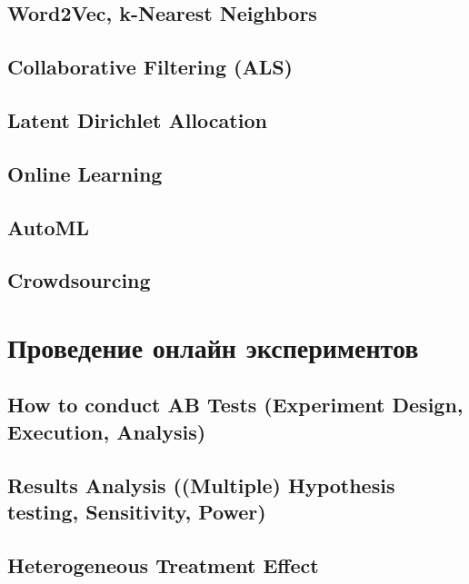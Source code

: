 \documentclass[openany,12pt]{book}
\numberwithin{equation}{section}
\begin{document}
\chapter{Word2Vec, k-Nearest Neighbors} %

\chapter{Collaborative Filtering (ALS)}

\chapter{Latent Dirichlet Allocation}

\chapter{Online Learning}

\chapter{AutoML}

\chapter{Crowdsourcing}

\part{Проведение онлайн экспериментов}
\chapter{How to conduct AB Tests (Experiment Design, Execution, Analysis)}

\chapter{Results Analysis ((Multiple) Hypothesis testing, Sensitivity, Power)}

\chapter{Heterogeneous Treatment Effect}

\nocite{*}




\end{document}

